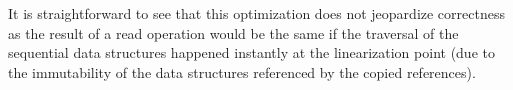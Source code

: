 \documentclass[a4paper,UKenglish]{oasics}
\begin{document}
It is straightforward to see that this optimization does not jeopardize correctness as the result of a read operation would be the same if the traversal of the sequential data structures happened instantly at the linearization point (due to the immutability of the data structures referenced by the copied references). %


\end{document}
